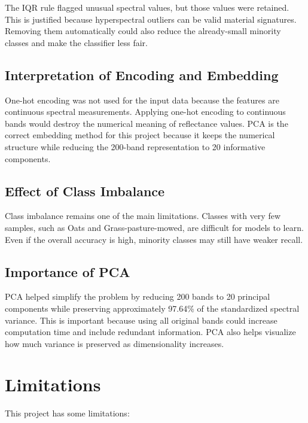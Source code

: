 \documentclass[12pt,a4paper]{article}
\begin{document}
The IQR rule flagged unusual spectral values, but those values were retained. This is justified because hyperspectral outliers can be valid material signatures. Removing them automatically could also reduce the already-small minority classes and make the classifier less fair.

\subsection{Interpretation of Encoding and Embedding}

One-hot encoding was not used for the input data because the features are continuous spectral measurements. Applying one-hot encoding to continuous bands would destroy the numerical meaning of reflectance values. PCA is the correct embedding method for this project because it keeps the numerical structure while reducing the 200-band representation to 20 informative components.

\subsection{Effect of Class Imbalance}

Class imbalance remains one of the main limitations. Classes with very few samples, such as Oats and Grass-pasture-mowed, are difficult for models to learn. Even if the overall accuracy is high, minority classes may still have weaker recall.

\subsection{Importance of PCA}

PCA helped simplify the problem by reducing 200 bands to 20 principal components while preserving approximately 97.64\% of the standardized spectral variance. This is important because using all original bands could increase computation time and include redundant information. PCA also helps visualize how much variance is preserved as dimensionality increases.

\section{Limitations}

This project has some limitations:
\end{document}
